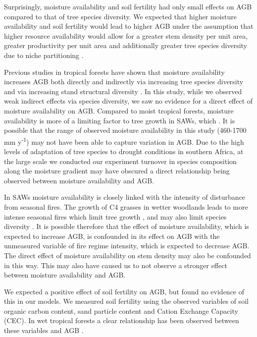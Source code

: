 \documentclass[11pt,a4paper]{article}
\newcommand{\textapprox}{\raisebox{0.5ex}{\texttildelow}}  %
\begin{document}
Surprisingly, moisture availability and soil fertility had only small effects on AGB compared to that of tree species diversity. We expected that higher moisture availability and soil fertility would lead to higher AGB under the assumption that higher resource availability would allow for a greater stem density per unit area, greater productivity per unit area and additionally greater tree species diversity due to niche partitioning \citep{Kraaij2006, Shirima2015}.

Previous studies in tropical forests have shown that moisture availability increases AGB both directly and indirectly via increasing tree species diversity and via increasing stand structural diversity \citep{Ali2019a, Ali2019b, Poorter2017}. In this study, while we observed weak indirect effects via species diversity, we saw no evidence for a direct effect of moisture availability on AGB. Compared to moist tropical forests, moisture availability is more of a limiting factor to tree growth in SAWs, which . It is possible that the range of observed moisture availability in this study (\textapprox{}460-1700 mm y\textsuperscript{-1}) may not have been able to capture variation in AGB. Due to the high levels of adaptation of tree species to drought conditions in southern Africa, at the large scale we conducted our experiment turnover in species composition along the moisture gradient may have obscured a direct relationship being observed between moisture availability and AGB.

In SAWs moisture availability is closely linked with the intensity of disturbance from seasonal fires. The growth of C4 grasses in wetter woodlands leads to more intense seasonal fires which limit tree growth \citep{Charles-Dominique2018}, and may also limit species diversity \citep{Linder2014}. It is possible therefore that the effect of moisture availability, which is expected to increase AGB, is confounded in its effect on AGB with the unmeasured variable of fire regime intensity, which is expected to decrease AGB. The direct effect of moisture availability on stem density may also be confounded in this way. This may also have caused us to not observe a stronger effect between moisture availability and AGB.

We expected a positive effect of soil fertility on AGB, but found no evidence of this in our models. We measured soil fertility using the observed variables of soil organic carbon content, sand particle content and Cation Exchange Capacity (CEC). In wet tropical forests a clear relationship has been observed between these variables and AGB \citep{Slik2009, Coelho-de-Souza2019}. 
\end{document}
